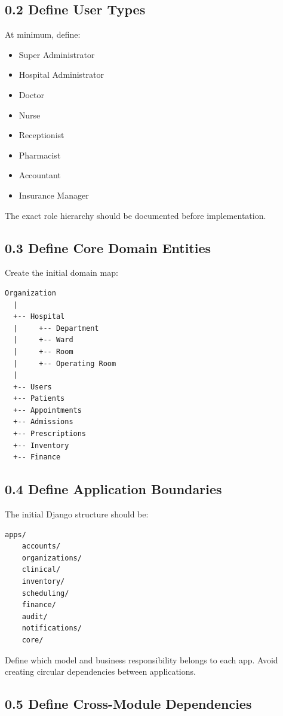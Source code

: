 \documentclass[11pt,a4paper]{article}
\begin{document}
\subsection{0.2 Define User Types}

At minimum, define:

\begin{itemize}
    \item Super Administrator
    \item Hospital Administrator
    \item Doctor
    \item Nurse
    \item Receptionist
    \item Pharmacist
    \item Accountant
    \item Insurance Manager
\end{itemize}

The exact role hierarchy should be documented before implementation.

\subsection{0.3 Define Core Domain Entities}

Create the initial domain map:

\begin{lstlisting}
Organization
  |
  +-- Hospital
  |     +-- Department
  |     +-- Ward
  |     +-- Room
  |     +-- Operating Room
  |
  +-- Users
  +-- Patients
  +-- Appointments
  +-- Admissions
  +-- Prescriptions
  +-- Inventory
  +-- Finance
\end{lstlisting}

\subsection{0.4 Define Application Boundaries}

The initial Django structure should be:

\begin{lstlisting}
apps/
    accounts/
    organizations/
    clinical/
    inventory/
    scheduling/
    finance/
    audit/
    notifications/
    core/
\end{lstlisting}

Define which model and business responsibility belongs to each app.
Avoid creating circular dependencies between applications.

\subsection{0.5 Define Cross-Module Dependencies}
\end{document}
